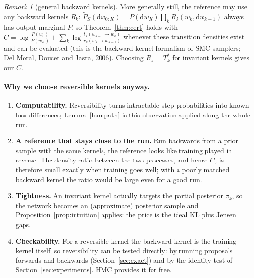 \documentclass[11pt]{article}
\theoremstyle{definition}
\theoremstyle{remark}
\newtheorem{remark}[theorem]{Remark}
\newcommand{\Pt}{\widetilde{P}}
\newcommand{\dd}{\mathrm{d}}
\begin{document}
\begin{remark}[general backward kernels]\label{rem:backward}
More generally still, the reference may use any backward kernels $R_k$:
$\Pt_S(\dd w_{0:K})=P(\dd w_K)\prod_kR_k(w_k,\dd w_{k-1})$ always has output marginal $P$, so Theorem~\ref{thm:cert} holds with
$C=\log\frac{P(w_0)}{P(w_K)}+\sum_k\log\frac{t_k(w_{k-1}\to w_k)}{r_k(w_k\to w_{k-1})}$ whenever these transition densities exist and
can be evaluated (this is the backward-kernel formalism of SMC samplers; Del Moral, Doucet and Jasra, 2006). Choosing
$R_k=T_k^\ast$ for invariant kernels gives our $C$.
\end{remark}

\paragraph{Why we choose reversible kernels anyway.}
\begin{enumerate}[nosep]
\item \textbf{Computability.} Reversibility turns intractable step probabilities into known loss differences; Lemma~\ref{lem:path}
  is this observation applied along the whole run.
\item \textbf{A reference that stays close to the run.} Run backwards from a prior sample with the same kernels, the
  reference looks like training played in reverse. The density ratio between the two processes, and hence $C$, is
  therefore small exactly when training goes well; with a poorly matched backward kernel the ratio would be large even
  for a good run.
\item \textbf{Tightness.} An invariant kernel actually targets the partial posterior $\pi_k$, so the network becomes an
  (approximate) posterior sample and Proposition~\ref{prop:intuition} applies: the price is the ideal KL plus Jensen gaps.
\item \textbf{Checkability.} For a reversible kernel the backward kernel is the training kernel itself, so reversibility
  can be tested directly: by running proposals forwards and backwards (Section~\ref{sec:exact}) and by the identity test of
  Section~\ref{sec:experiments}. HMC provides it for free.
\end{enumerate}
\end{document}

